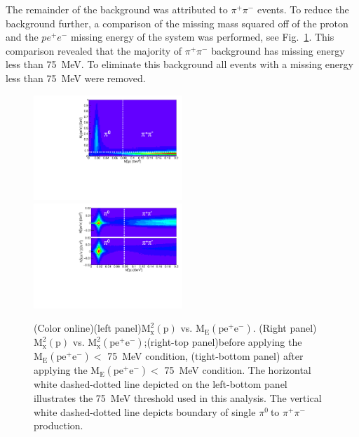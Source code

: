\documentclass[aps,prc,twocolumn,floatfix,showpacs,preprintnumbers,amsmath,amssymb,superscriptaddress]{revtex4-1}
\def\pizT{$\pi^{0} \ $}
\begin{document}
The remainder of the background was attributed to $\pi^+\pi^-$
events. To reduce the background further, a comparison of the missing mass squared off of the proton and the $pe^+e^-$ missing energy of the system was 
performed, see Fig.~\ref{fig:sys}. This comparison revealed that the majority of
$\pi^+\pi^-$ background has missing energy less than 75~MeV. 
To eliminate this background all events with a missing energy 
less than 75~MeV were removed.

\begin{figure}[htb!]
	\centerline{
		\includegraphics[height=0.4\textwidth,width=0.5\textwidth]{ME_vs_mxpcompare.pdf} \label{fig:beforecut}\hfill
		\includegraphics[height=0.4\textwidth,width=0.5\textwidth]{mm2_vs_mxp_compare.pdf}
		\label{fig:aftercut}}	
	\caption{(Color online)(left panel)$\mathrm{M_x^2(p)}$ vs. $\mathrm{M_E(pe^+e^-)}$. (Right panel)$\mathrm{M_x^2(p)}$ vs. $\mathrm{M_x^2(pe^+e^-)}$;(right-top panel)before applying the $\mathrm{M_E(pe^+e^-)} <$ 75~MeV condition, (tight-bottom panel) after applying the $\mathrm{M_E(pe^+e^-)} <$ 75~MeV condition. The horizontal white dashed-dotted line depicted on the left-bottom panel illustrates the 75~MeV threshold used in this analysis. The vertical white dashed-dotted line depicts boundary of single \pizT to $\pi^+\pi^-$  production.	
	}\label{fig:sys}		
\end{figure}
\end{document}
